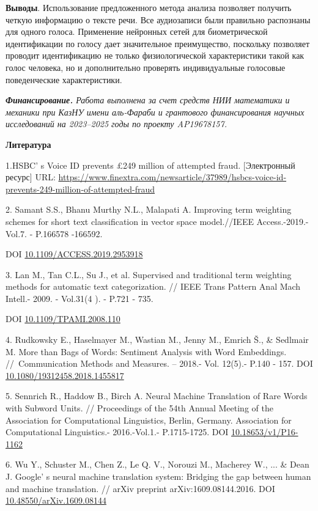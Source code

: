 {\bfseries Выводы}. Использование предложенного метода анализа позволяет
получить четкую информацию о тексте речи. Все аудиозаписи были правильно
распознаны для одного голоса. Применение нейронных сетей для
биометрической идентификации по голосу дает значительное преимущество,
поскольку позволяет проводит идентификацию не только физиологической
характеристики такой как голос человека, но и дополнительно проверять
индивидуальные голосовые поведенческие характеристики.

\emph{{\bfseries Финансирование.} Работа выполнена за счет средств НИИ
математики и механики при КазНУ имени аль-Фараби и грантового
финансирования научных исследований на 2023--2025 годы по проекту
AP19678157.}

{\bfseries Литература}

1.HSBC' s Voice ID prevents £249 million of attempted
fraud. {[}Электронный ресурс{]} URL:
\url{https://www.finextra.com/newsarticle/37989/hsbcs-voice-id-prevents-249-million-of-attempted-fraud}

2. Samant S.S., Bhanu Murthy N.L., Malapati A. Improving term weighting
schemes for short text classification in vector space model.//IEEE
Access.-2019.- Vol.7. - P.166578 -166592.

DOI
\href{https://doi.org/10.1109/ACCESS.2019.2953918}{10.1109/ACCESS.2019.2953918}

3. Lan M., Tan C.L., Su J., et al. Supervised and traditional term
weighting methods for automatic text categorization. // IEEE Trans
Pattern Anal Mach Intell.- 2009. - Vol.31(4 ). - P.721 - 735.

DOI
\href{https://doi.org/10.1109/tpami.2008.110}{10.1109/TPAMI.2008.110}

4. Rudkowsky E., Haselmayer M., Wastian M., Jenny M., Emrich Š., \&
Sedlmair M. More than Bags of Words: Sentiment Analysis with Word
Embeddings. //~Communication Methods and Measures. -- 2018.- Vol.
12(5).- P.140 - 157. DOI
\href{http://dx.doi.org/10.1080/19312458.2018.1455817}{10.1080/19312458.2018.1455817}

5. Sennrich R., Haddow B., Birch A. Neural Machine Translation of Rare
Words with Subword Units. // Proceedings of the 54th Annual Meeting of
the Association for Computational Linguistics, Berlin, Germany.
Association for Computational Linguistics.- 2016.-Vol.1.- P.1715-1725.
DOI \href{https://doi.org/10.18653/v1/P16-1162}{10.18653/v1/P16-1162}

6. Wu Y., Schuster M., Chen Z., Le Q. V., Norouzi M., Macherey W., ...
\& Dean J. Google' s neural machine translation system:
Bridging the gap between human and machine translation. // arXiv
preprint arXiv:1609.08144.2016. DOI
\href{http://dx.doi.org/10.48550/arXiv.1609.08144}{10.48550/arXiv.1609.08144}


